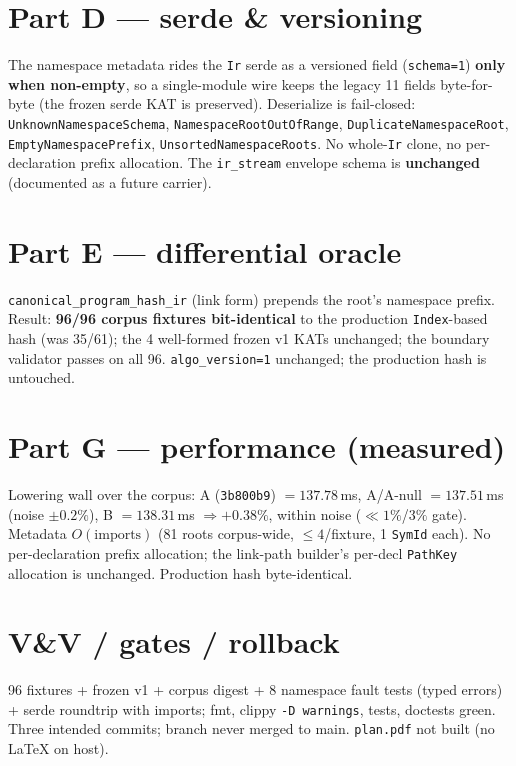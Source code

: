 \documentclass[11pt]{article}
\begin{document}
\section*{Part D --- serde \& versioning}
The namespace metadata rides the \texttt{Ir} serde as a versioned field
(\texttt{schema=1}) \textbf{only when non-empty}, so a single-module wire keeps the
legacy 11 fields byte-for-byte (the frozen serde KAT is preserved). Deserialize is
fail-closed: \texttt{UnknownNamespaceSchema}, \texttt{NamespaceRootOutOfRange},
\texttt{DuplicateNamespaceRoot}, \texttt{EmptyNamespacePrefix},
\texttt{UnsortedNamespaceRoots}. No whole-\texttt{Ir} clone, no per-declaration
prefix allocation. The \texttt{ir\_stream} envelope schema is \textbf{unchanged}
(documented as a future carrier).

\section*{Part E --- differential oracle}
\texttt{canonical\_program\_hash\_ir} (link form) prepends the root's namespace
prefix. Result: \textbf{96/96 corpus fixtures bit-identical} to the production
\texttt{Index}-based hash (was 35/61); the 4 well-formed frozen v1 KATs unchanged;
the boundary validator passes on all 96. \texttt{algo\_version=1} unchanged; the
production hash is untouched.

\section*{Part G --- performance (measured)}
Lowering wall over the corpus: A (\texttt{3b800b9}) $=137.78$\,ms, A/A-null
$=137.51$\,ms (noise $\pm 0.2\%$), B $=138.31$\,ms $\Rightarrow +0.38\%$, within
noise ($\ll 1\%$/$3\%$ gate). Metadata $O(\text{imports})$ (81 roots corpus-wide,
$\leq 4$/fixture, 1 \texttt{SymId} each). No per-declaration prefix allocation; the
link-path builder's per-decl \texttt{PathKey} allocation is unchanged. Production
hash byte-identical.

\section*{V\&V / gates / rollback}
96 fixtures + frozen v1 + corpus digest + 8 namespace fault tests (typed errors) +
serde roundtrip with imports; fmt, clippy \texttt{-D warnings}, tests, doctests
green. Three intended commits; branch never merged to main. \texttt{plan.pdf} not
built (no LaTeX on host).
\end{document}
